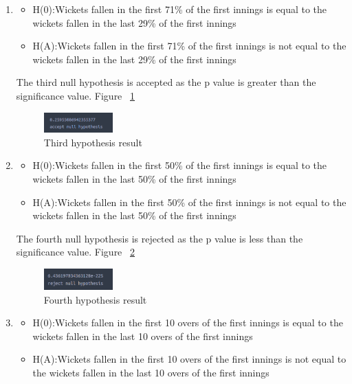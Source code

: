 \documentclass[fleqn,10pt]{wlscirep}
\begin{document}
\begin{enumerate}
\item
\begin{itemize}
    \item H(0):Wickets fallen in the first 71\% of the first innings is equal to the wickets fallen in the last 29\% of the first innings
    \item H(A):Wickets fallen in the first 71\% of the first innings is not equal to the wickets fallen in the last 29\% of the first innings
\end{itemize}
The third null hypothesis is accepted as the p value is greater than the significance value. Figure ~\ref{fig:fourteen}
\begin{figure}[!htb]
    \centering
    \includegraphics[width=0.25\textwidth]{secondsecond.png}
    \caption{Third hypothesis result}
    \label{fig:fourteen}
  \end{figure}

\item
\begin{itemize}
    \item H(0):Wickets fallen in the first 50\% of the first innings is equal to the wickets fallen in the last 50\% of the first innings
    \item H(A):Wickets fallen in the first 50\% of the first innings is not equal to the wickets fallen in the last 50\% of the first innings
\end{itemize}
The fourth null hypothesis is rejected as the p value is less than the significance value. Figure ~\ref{fig:fifteen}
\begin{figure}[!htb]
    \centering
    \includegraphics[width=0.25\textwidth]{secondthird.png}
    \caption{Fourth hypothesis result}
    \label{fig:fifteen}
  \end{figure}

\item
\begin{itemize}
    \item H(0):Wickets fallen in the first 10 overs of the first innings is equal to the wickets fallen in the last 10 overs of the first innings
    \item H(A):Wickets fallen in the first 10 overs of the first innings is not equal to the wickets fallen in the last 10 overs of the first innings
\end{itemize}


\end{enumerate}
\end{document}
